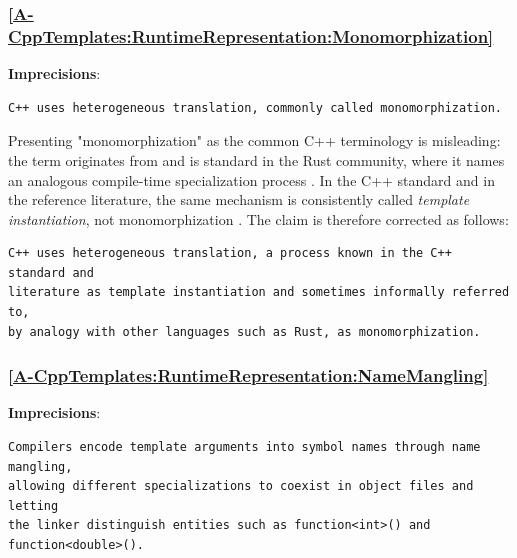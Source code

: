 \documentclass[11pt]{report}
\begin{document}
\subsubsection*{\hyperref[A-CppTemplates:RuntimeRepresentation:Monomorphization]{\ref*{A-CppTemplates:RuntimeRepresentation:Monomorphization} }}
\noindent\textbf{Imprecisions}:

\begin{Verbatim}[breaklines=true]
C++ uses heterogeneous translation, commonly called monomorphization.
\end{Verbatim}

Presenting "monomorphization" as the common C++ terminology is misleading: the
term originates from and is standard in the Rust community, where it names an
analogous compile-time specialization process \cite{rust_monomorphization}. In
the C++ standard and in the reference literature, the same mechanism is
consistently called \emph{template instantiation}, not monomorphization
\cite{iso_cpp2024,cpp_templates2017}. The claim is therefore corrected as
follows:

\begin{Verbatim}[breaklines=true]
C++ uses heterogeneous translation, a process known in the C++ standard and
literature as template instantiation and sometimes informally referred to,
by analogy with other languages such as Rust, as monomorphization.
\end{Verbatim}

\subsubsection*{\hyperref[A-CppTemplates:RuntimeRepresentation:NameMangling]{\ref*{A-CppTemplates:RuntimeRepresentation:NameMangling} }}
\noindent\textbf{Imprecisions}:

\begin{Verbatim}[breaklines=true]
Compilers encode template arguments into symbol names through name mangling,
allowing different specializations to coexist in object files and letting
the linker distinguish entities such as function<int>() and function<double>().
\end{Verbatim}
\end{document}
